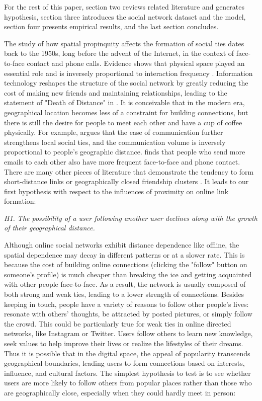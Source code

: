 For the rest of this paper, section two reviews related literature and generates hypothesis, section three introduces the social network dataset and the model, section four presents empirical results, and the last section concludes.

The study of how spatial propinquity affects the formation of social ties dates back to the 1950s, long before the advent of the Internet, in the context of face-to-face contact and phone calls. Evidence shows that physical space played an essential role and is inversely proportional to interaction frequency \cite{snow1981social,blake1956housing,latane1995distance}. Information technology reshapes the structure of the social network by greatly reducing the cost of making new friends and maintaining relationships, leading to the statement of "Death of Distance" in \cite{cairncross2001death}. It is conceivable that in the modern era, geographical location becomes less of a constraint for building connections, but there is still the desire for people to meet each other and have a cup of coffee physically. For example, \cite{goldenberg2009distance} argues that the ease of communication further strengthens local social ties, and the communication volume is inversely proportional to people's geographic distance. \cite{boase2006article} finds that people who send more emails to each other also have more frequent face-to-face and phone contact.
There are many other pieces of literature that demonstrate the tendency to form short-distance links or geographically closed friendship clusters \cite{scellato2010distance, liben2005geographic, hipp2009simultaneous, backstrom2010find}. It leads to our first hypothesis with respect to the influences of proximity on online link formation:

\textit{H1. The possibility of a user following another user declines along with the growth of their geographical distance.}

Although online social networks exhibit distance dependence like offline, the spatial dependence may decay in different patterns or at a slower rate. This is because the cost of building online connections (clicking the "follow" button on someone's profile) is much cheaper than breaking the ice and getting acquainted with other people face-to-face. As a result, the network is usually composed of both strong and weak ties, leading to a lower strength of connections. Besides keeping in touch, people have a variety of reasons to follow other people's lives: resonate with others' thoughts, be attracted by posted pictures, or simply follow the crowd. This could be particularly true for weak ties in online directed networks, like Instagram or Twitter. Users follow others to learn new knowledge, seek values to help improve their lives or realize the lifestyles of their dreams. Thus it is possible that in the digital space, the appeal of popularity transcends geographical boundaries, leading users to form connections based on interests, influence, and cultural factors. The simplest hypothesis to test is to see whether users are more likely to follow others from popular places rather than those who are geographically close, especially when they could hardly meet in person:

